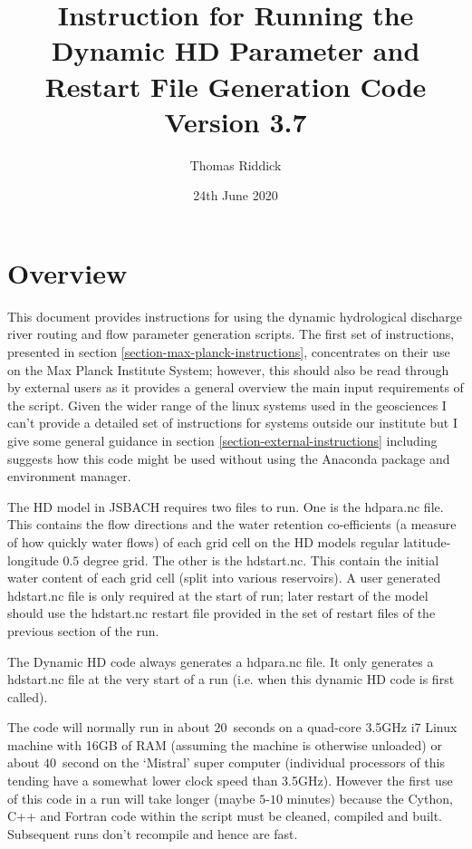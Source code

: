 \documentclass{article}
\title{Instruction for Running the Dynamic HD Parameter and Restart File Generation Code Version 3.7}
\author{Thomas Riddick}
\date{24th June 2020}
\begin{document}
\lstset{language=bash}
\maketitle
\section{Overview}
This document provides instructions for using the dynamic hydrological discharge river routing and flow parameter generation scripts. The first set of instructions, presented in section \ref{section-max-planck-instructions}, concentrates on their use on the Max Planck Institute System; however, this should also be read through by external users as it provides a general overview the main input requirements of the script. Given the wider range of the linux systems used in the geosciences I can't provide a detailed set of instructions for systems outside our institute but I give some general guidance in section \ref{section-external-instructions} including suggests how this code might be used without using the Anaconda package and environment manager.

The HD model in JSBACH requires two files to run. One is the hdpara.nc file. This contains the flow directions and the water retention co-efficients (a measure of how quickly water flows) of each grid cell on the HD models regular latitude-longitude $0.5$ degree grid. The other is the hdstart.nc. This contain the initial water content of each grid cell (split into various reservoirs). A user generated hdstart.nc file is only required at the start of run; later restart of the model should use the hdstart.nc restart file provided in the set of restart files of the previous section of the run.

The Dynamic HD code always generates a hdpara.nc file. It only generates a hdstart.nc file at the very start of a run (i.e. when this dynamic HD code is first called).

The code will normally run in about $20$~seconds on a quad-core  3.5GHz i7 Linux machine with 16GB of RAM (assuming the machine is otherwise unloaded) or about $40$~second on the `Mistral' super computer (individual processors of this tending have a somewhat lower clock speed than 3.5GHz). However the first use of this code in a run will take longer (maybe $5$-$10$ minutes) because the Cython, C++ and Fortran code within the script must be cleaned, compiled and built. Subsequent runs don't recompile and hence are fast.
\end{document}
